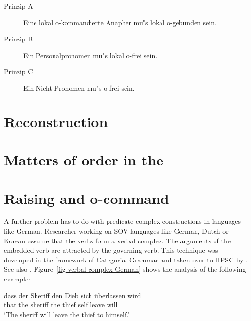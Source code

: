 \documentclass[output=paper
                ,modfonts
                ,nonflat
	        ,collection
	        ,collectionchapter
	        ,collectiontoclongg
 	        ,biblatex
                ,babelshorthands
                ,newtxmath
                ,draftmode
                ,colorlinks, citecolor=brown
]{./langsci/langscibook}
\begin{document}
\begin{principle-break}
\begin{description}
\item [Prinzip A] Eine lokal o-kom\-man\-dierte Anapher mu"s lokal o-gebunden sein.
\item [Prinzip B] Ein Personalpronomen mu"s lokal o-frei sein.
\item [Prinzip C] Ein Nicht-Pronomen mu"s o-frei sein.
\end{description}
\end{principle-break}


\section{Reconstruction}


\section{Matters of order in the \argstl}

\section{Raising and o-command}


A further problem has to do with predicate complex constructions in languages like
German. Researcher working on SOV languages like German, Dutch or Korean assume that the verbs form
a verbal complex. The arguments of the embedded verb are attracted by the governing verb. This
technique was developed in the framework of Categorial Grammar and taken over to HPSG by
\citet{HN89a,HN94a}. See also
. Figure~\ref{fig-verbal-complex-German} shows the analysis of
the following example:

\ea
\gll dass der Sheriff den Dieb  sich überlassen wird\\
     that the sheriff the thief self leave      will\\
\glt `The sheriff will leave the thief to himself.'
\z
\end{document}

